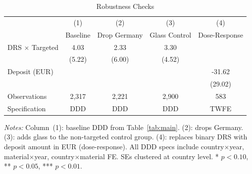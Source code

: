 \begin{table}[H]
\centering
\caption{Robustness Checks}
\label{tab:robust}
\begin{threeparttable}
\begin{tabular}{lcccc}
\toprule
 & (1) & (2) & (3) & (4) \\
 & Baseline & Drop Germany & Glass Control & Dose-Response \\
\midrule
DRS $\times$ Targeted & 4.03 & 2.33 & 3.30 &  \\
 & (5.22) & (6.00) & (4.52) &  \\
Deposit (EUR) &  &  &  & -31.62 \\
 &  &  &  & (29.02) \\
\midrule
Observations & 2,317 & 2,221 & 2,900 & 583 \\
Specification & DDD & DDD & DDD & TWFE \\
\bottomrule
\end{tabular}
\begin{tablenotes}[flushleft]\small
\item \textit{Notes:} Column~(1): baseline DDD from Table~\ref{tab:main}. (2): drops Germany. (3): adds glass to the non-targeted control group. (4): replaces binary DRS with deposit amount in EUR (dose-response). All DDD specs include country$\times$year, material$\times$year, country$\times$material FE. SEs clustered at country level. * $p<0.10$, ** $p<0.05$, *** $p<0.01$.
\end{tablenotes}
\end{threeparttable}
\end{table}

